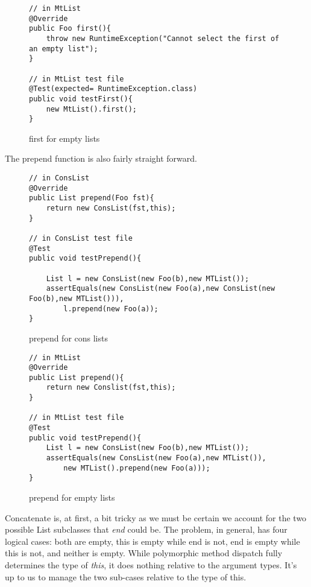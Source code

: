 \documentclass[]{tufte-handout}
\begin{document}
\begin{figure}
\begin{lstlisting}
// in MtList
@Override
public Foo first(){
	throw new RuntimeException("Cannot select the first of an empty list");
}

// in MtList test file
@Test(expected= RuntimeException.class)
public void testFirst(){
	new MtList().first();
}
\end{lstlisting}
\label{fig:mtfst}
\caption{first for empty lists}
\end{figure}


The prepend function is also fairly straight forward. 

\begin{figure}
\begin{lstlisting}
// in ConsList
@Override
public List prepend(Foo fst){
	return new ConsList(fst,this);
}

// in ConsList test file
@Test
public void testPrepend(){

	List l = new ConsList(new Foo(b),new MTList());
	assertEquals(new ConsList(new Foo(a),new ConsList(new Foo(b),new MTList())),
		l.prepend(new Foo(a));
}

\end{lstlisting}
\caption{prepend for cons lists}
\end{figure}

\begin{figure}
\begin{lstlisting}
// in MtList
@Override
public List prepend(){
	return new Conslist(fst,this);
}

// in MtList test file
@Test
public void testPrepend(){
	List l = new ConsList(new Foo(b),new MTList());
	assertEquals(new ConsList(new Foo(a),new MTList()),
		new MTList().prepend(new Foo(a)));
}
\end{lstlisting}
\label{fig:listpre}
\caption{prepend for empty lists}
\end{figure}

Concatenate is, at first, a bit tricky as we must be certain we account for the two possible List subclasses that \textit{end} could be. The problem, in general, has four logical cases: both are empty, this is empty while end is not, end is empty while this is not, and neither is empty. While polymorphic method dispatch fully determines the type of \textit{this}, it does nothing relative to the argument types. It's up to us to manage the two sub-cases relative to the type of this. 
\end{document}

